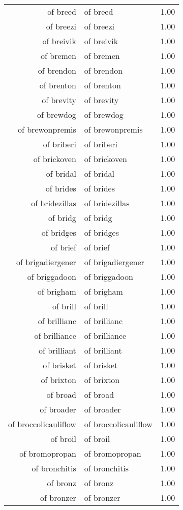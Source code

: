 \begin{table}[ht]
\begin{tabular}{rlr}
  of breed & of breed & 1.00 \\ 
  of breezi & of breezi & 1.00 \\ 
  of breivik & of breivik & 1.00 \\ 
  of bremen & of bremen & 1.00 \\ 
  of brendon & of brendon & 1.00 \\ 
  of brenton & of brenton & 1.00 \\ 
  of brevity & of brevity & 1.00 \\ 
  of brewdog & of brewdog & 1.00 \\ 
  of brewonpremis & of brewonpremis & 1.00 \\ 
  of briberi & of briberi & 1.00 \\ 
  of brickoven & of brickoven & 1.00 \\ 
  of bridal & of bridal & 1.00 \\ 
  of brides & of brides & 1.00 \\ 
  of bridezillas & of bridezillas & 1.00 \\ 
  of bridg & of bridg & 1.00 \\ 
  of bridges & of bridges & 1.00 \\ 
  of brief & of brief & 1.00 \\ 
  of brigadiergener & of brigadiergener & 1.00 \\ 
  of briggadoon & of briggadoon & 1.00 \\ 
  of brigham & of brigham & 1.00 \\ 
  of brill & of brill & 1.00 \\ 
  of brillianc & of brillianc & 1.00 \\ 
  of brilliance & of brilliance & 1.00 \\ 
  of brilliant & of brilliant & 1.00 \\ 
  of brisket & of brisket & 1.00 \\ 
  of brixton & of brixton & 1.00 \\ 
  of broad & of broad & 1.00 \\ 
  of broader & of broader & 1.00 \\ 
  of broccolicauliflow & of broccolicauliflow & 1.00 \\ 
  of broil & of broil & 1.00 \\ 
  of bromopropan & of bromopropan & 1.00 \\ 
  of bronchitis & of bronchitis & 1.00 \\ 
  of bronz & of bronz & 1.00 \\ 
  of bronzer & of bronzer & 1.00 \\ 

\end{tabular}
\end{table}
